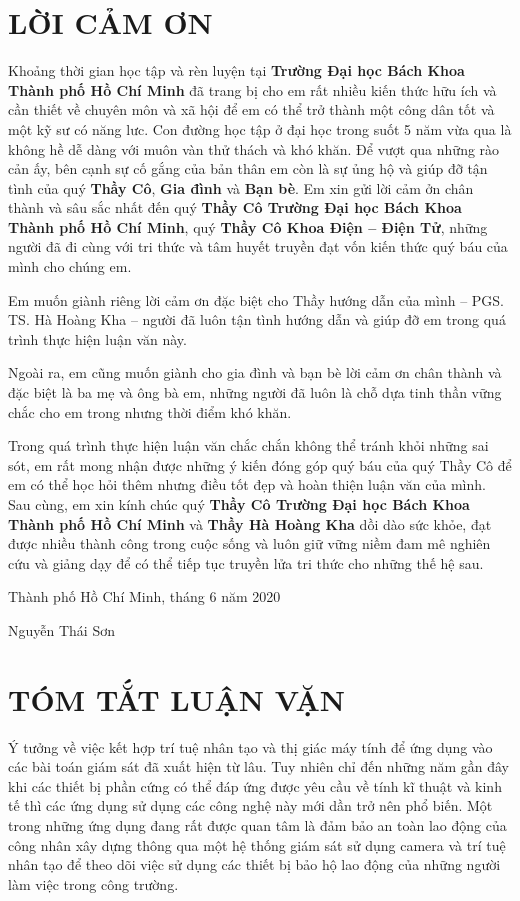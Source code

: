 \documentclass[12pt]{report}
\begin{document}
%
\chapter*{LỜI CẢM ƠN}
Khoảng thời gian học tập và rèn luyện tại \textbf{Trường Đại học Bách Khoa
Thành phố Hồ Chí Minh} đã trang bị cho em rất nhiều kiến thức hữu ích và cần thiết
về chuyên môn và xã hội để em có thể trở thành một công dân tốt và một kỹ sư
có năng lưc. Con đường học tập ở đại học trong suốt 5 năm vừa qua là không 
hề dễ dàng với muôn vàn thử thách và khó khăn. Để vượt qua những rào cản ấy, bên 
cạnh sự cố gắng của bản thân em còn là sự ủng hộ và giúp đỡ tận tình của quý \textbf{Thầy Cô}, 
\textbf{Gia đình} và \textbf{Bạn bè}. Em xin gửi lời cảm ởn chân thành và sâu sắc nhất 
đến quý \textbf{Thầy Cô Trường Đại học Bách Khoa Thành phố Hồ Chí Minh}, quý 
\textbf{Thầy Cô Khoa Điện – Điện Tử}, những người đã đi cùng với tri thức và 
tâm huyết truyền đạt vốn kiến thức quý báu của mình cho chúng em.

Em muốn giành riêng lời cảm ơn đặc biệt cho Thầy hướng dẫn của mình
– PGS. TS. Hà Hoàng Kha – người đã luôn tận tình hướng dẫn và giúp đỡ em trong
quá trình thực hiện luận văn này.

Ngoài ra, em cũng muốn giành cho gia đình và bạn bè lời cảm ơn chân thành và đặc
biệt là ba mẹ và ông bà em, những người đã luôn là chỗ dựa tinh thần vững chắc 
cho em trong nhưng thời điểm khó khăn.

Trong quá trình thực hiện luận văn chắc chắn không thể tránh khỏi những sai
sót, em rất mong nhận được những ý kiến đóng góp quý báu của quý Thầy
Cô để em có thể học hỏi thêm nhưng điều tốt đẹp và hoàn thiện luận văn của mình.
Sau cùng, em xin kính chúc quý \textbf{Thầy Cô Trường Đại học Bách Khoa Thành
phố Hồ Chí Minh} và \textbf{Thầy Hà Hoàng Kha} dồi dào sức khỏe, đạt được nhiều thành
công trong cuộc sống và luôn giữ vững niềm đam mê nghiên cứu và giảng dạy để có thể
tiếp tục truyền lửa tri thức cho những thế hệ sau.

\hfill
Thành phố Hồ Chí Minh, tháng 6 năm 2020

\vspace{0.5cm}

\hfill
Nguyễn Thái Sơn

\chapter*{TÓM TẮT LUẬN VẶN}
Ý tưởng về việc kết hợp trí tuệ nhân tạo và thị giác máy tính để ứng dụng vào các bài 
toán giám sát đã xuất hiện từ lâu. Tuy nhiên chỉ đến những năm gần đây khi các thiết bị
phần cứng có thể đáp ứng được yêu cầu về tính kĩ thuật và kinh tế thì các ứng dụng 
sử dụng các công nghệ này mới dần trở nên phổ biến. Một trong những ứng dụng đang rất được 
quan tâm là đảm bảo an toàn lao động của công nhân xây dựng thông qua một hệ thống giám 
sát sử dụng camera và trí tuệ nhân tạo để theo dõi việc sử dụng các thiết bị bảo hộ lao 
động của những người làm việc trong công trường.
\end{document}
